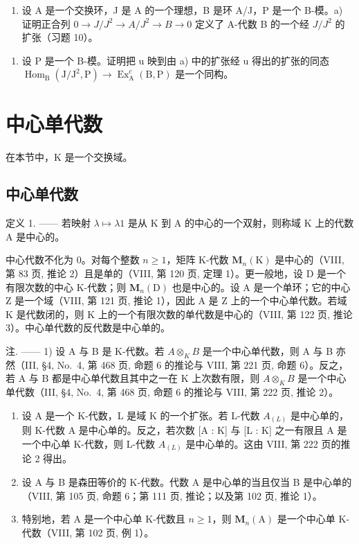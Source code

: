 \begin{enumerate}
\def\labelenumi{\arabic{enumi})}
\setcounter{enumi}{11}
\tightlist
\item
  设 A 是一个交换环，J 是 A 的一个理想，B 是环 A/J，P 是一个 B-模。a) 证明正合列 \(0 \rightarrow J/J^{2} \rightarrow A/J^{2} \rightarrow B \rightarrow 0\) 定义了 A-代数 B 的一个经 \(J/J^{2}\) 的扩张（习题 10）。
\end{enumerate}

\begin{enumerate}
\def\labelenumi{\alph{enumi})}
\setcounter{enumi}{1}
\tightlist
\item
  设 P 是一个 B-模。证明把 u 映到由 a) 中的扩张经 u 得出的扩张的同态 \(\operatorname{Hom}_{\mathrm{B}}(\mathrm{J}/\mathrm{J}^{2},\mathrm{P}) \to \operatorname{Ex}_{\mathrm{A}}^{c}(\mathrm{B},\mathrm{P})\) 是一个同构。
\end{enumerate}

\section{中心单代数}

在本节中，K 是一个交换域。

\subsection{中心单代数}

定义 1. —— 若映射 \(\lambda\mapsto\lambda1\) 是从 K 到 A 的中心的一个双射，则称域 K 上的代数 A 是中心的。

中心代数不化为 0。对每个整数 \(n \geqslant 1\)，矩阵 K-代数 \(\mathbf{M}_{n}(\mathrm{K})\) 是中心的（VIII, 第 83 页, 推论 2）且是单的（VIII, 第 120 页, 定理 1）。更一般地，设 D 是一个有限次数的中心 K-代数；则 \(\mathbf{M}_{n}(\mathrm{D})\) 也是中心的。设 A 是一个单环；它的中心 Z 是一个域（VIII, 第 121 页, 推论 1），因此 A 是 Z 上的一个中心单代数。若域 K 是代数闭的，则 K 上的一个有限次数的单代数是中心的（VIII, 第 122 页, 推论 3）。中心单代数的反代数是中心单的。

注. —— 1) 设 A 与 B 是 K-代数。若 \(A \otimes_{K} B\) 是一个中心单代数，则 A 与 B 亦然（III, §4, No.~4, 第 468 页, 命题 6 的推论与 VIII, 第 221 页, 命题 6）。反之，若 A 与 B 都是中心单代数且其中之一在 K 上次数有限，则 \(A \otimes_{K} B\) 是一个中心单代数（III, §4, No.~4, 第 468 页, 命题 6 的推论与 VIII, 第 222 页, 推论 2）。

\begin{enumerate}
\def\labelenumi{\arabic{enumi})}
\setcounter{enumi}{1}
\item
  设 A 是一个 K-代数，L 是域 K 的一个扩张。若 L-代数 \(A_{(L)}\) 是中心单的，则 K-代数 A 是中心单的。反之，若次数 {[}A : K{]} 与 {[}L : K{]} 之一有限且 A 是一个中心单 K-代数，则 L-代数 \(A_{(L)}\) 是中心单的。这由 VIII, 第 222 页的推论 2 得出。
\item
  设 A 与 B 是森田等价的 K-代数。代数 A 是中心单的当且仅当 B 是中心单的（VIII, 第 105 页, 命题 6；第 111 页, 推论；以及第 102 页, 推论 1）。
\item
  特别地，若 A 是一个中心单 K-代数且 \(n \geqslant 1\)，则 \(\mathbf{M}_{n}(\mathrm{A})\) 是一个中心单 K-代数（VIII, 第 102 页, 例 1）。
\end{enumerate}


